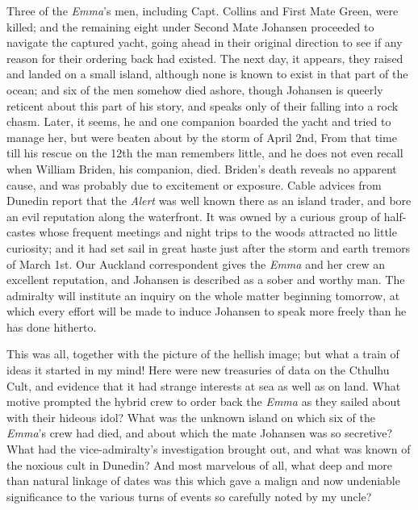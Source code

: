 \begin{pages}
\begin{Leftside}
Three of the \emph{Emma}'s men, including Capt. Collins and First Mate Green,
were killed; and the remaining eight under Second Mate Johansen
proceeded to navigate the captured yacht, going ahead in their original
direction to see if any reason for their ordering back had existed. The
next day, it appears, they raised and landed on a small island, although
none is known to exist in that part of the ocean; and six of the men
somehow died ashore, though Johansen is queerly reticent about this part
of his story, and speaks only of their falling into a rock chasm. Later,
it seems, he and one companion boarded the yacht and tried to manage
her, but were beaten about by the storm of April 2nd, From that time
till his rescue on the 12th the man remembers little, and he does not
even recall when William Briden, his companion, died. Briden's death
reveals no apparent cause, and was probably due to excitement or
exposure. Cable advices from Dunedin report that the \emph{Alert} was well
known there as an island trader, and bore an evil reputation along the
waterfront. It was owned by a curious group of half-castes whose
frequent meetings and night trips to the woods attracted no little
 curiosity; and it had set sail in great haste just after the storm and
earth tremors of March 1st. Our Auckland correspondent gives the \emph{Emma}
and her crew an excellent reputation, and Johansen is described as a
sober and worthy man. The admiralty will institute an inquiry on the
whole matter beginning tomorrow, at which every effort will be made to
induce Johansen to speak more freely than he has done hitherto.

This was all, together with the picture of the hellish image; but what a
train of ideas it started in my mind! Here were new treasuries of data
on the Cthulhu Cult, and evidence that it had strange interests at sea
as well as on land. What motive prompted the hybrid crew to order back
the \emph{Emma} as they sailed about with their hideous idol? What was the
unknown island on which six of the \emph{Emma}'s crew had died, and about which
the mate Johansen was so secretive? What had the vice-admiralty's
investigation brought out, and what was known of the noxious cult in
Dunedin? And most marvelous of all, what deep and more than natural
linkage of dates was this which gave a malign and now undeniable
significance to the various turns of events so carefully noted by my
uncle?


\end{Leftside}
\end{pages}
